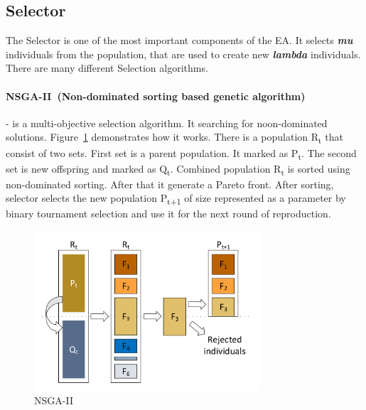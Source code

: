 \subsection{Selector}\label{sec:GeneticAlgorithm:Selector}

The Selector is one of the most important components of the EA. It selects \textit{\textbf{mu}} individuals from the population, that are used to create new \textit{\textbf{lambda}} individuals. There are many different Selection algorithms.


\paragraph{NSGA-II~(Non-dominated sorting based genetic algorithm)~\cite{deb2000}} - is a multi-objective selection algorithm. It searching for noon-dominated solutions. Figure~\ref{fig:nsga2} demonstrates how it works. There is a population \texorpdfstring{R\textsubscript{t}}{R t} that consist of two sets. First set is a parent population. It marked as \texorpdfstring{P\textsubscript{t}}{P t}. The second set is new offspring and marked as \texorpdfstring{Q\textsubscript{t}}{Q t}. Combined population \texorpdfstring{R\textsubscript{t}}{R t} is sorted using non-dominated sorting. After that it generate a Pareto front. After sorting, selector selects the new population \texorpdfstring{P\textsubscript{t+1}}{P t+1} of size represented as a parameter by binary tournament selection and use it for the next round of reproduction.

\begin{figure}
	\centering
	\includegraphics[width=0.75\textwidth]{images/nsga2.pdf}
	\caption[NSGA-II]{NSGA-II}
	\label{fig:nsga2}
\end{figure}

